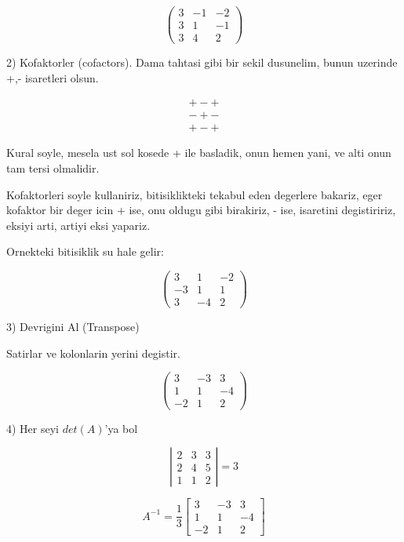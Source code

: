 \documentclass[12pt,fleqn]{article}\usepackage{../common}
\begin{document}
\[ 
\left(\begin{array}{rrr}
3 & -1 & -2 \\
3 & 1 & -1 \\
3 & 4 & 2
\end{array}\right)
 \]

2) Kofaktorler (cofactors). Dama tahtasi gibi bir sekil dusunelim, bunun
uzerinde +,- isaretleri olsun. 

\[ 
\begin{array}{rr}
+ - + \\
- + - \\
+ - + 
\end{array}
 \]

Kural soyle, mesela ust sol kosede + ile basladik, onun hemen yani, ve alti
onun tam tersi olmalidir. 

Kofaktorleri soyle kullaniriz, bitisiklikteki tekabul eden degerlere
bakariz, eger kofaktor bir deger icin + ise, onu oldugu gibi birakiriz, -
ise, isaretini degistiririz, eksiyi arti, artiyi eksi yapariz. 

Ornekteki bitisiklik su hale gelir:

\[ 
\left(\begin{array}{rrr}
3 & 1 & -2 \\
-3 & 1 & 1 \\
3 & -4 & 2
\end{array}\right)
 \]

3) Devrigini Al (Transpose)

Satirlar ve kolonlarin yerini degistir. 

\[ 
\left(\begin{array}{rrr}
3 & -3 & 3 \\
1 & 1 & -4 \\
-2 & 1 & 2
\end{array}\right)
 \]

4) Her seyi $det(A)$'ya bol

\[ 
\left|\begin{array}{rrr}
2 & 3 & 3 \\
2 & 4 & 5 \\
1 & 1 & 2
\end{array}\right| = 3
 \]


\[ A^{-1} = 
\frac{1}{3}
\left[\begin{array}{rrr}
3 & -3 & 3 \\
1 & 1 & -4 \\
-2 & 1 & 2
\end{array}\right]
 \]
\end{document}

